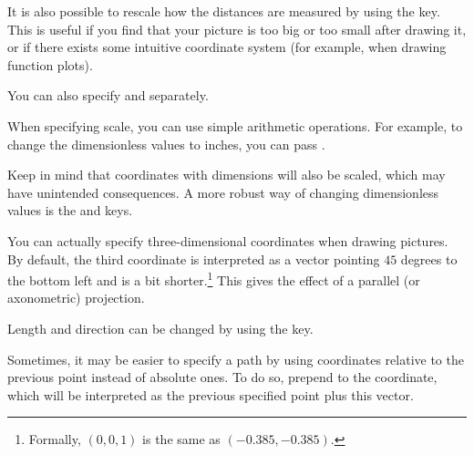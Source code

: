 It is also possible to rescale how the distances are measured by using the
 key. This is useful if you find that your picture is too big or
too small after drawing it, or if there exists some intuitive coordinate system
(for example, when drawing function plots).
\begin{example}
\end{example}
You can also specify  and  separately.

When specifying scale, you can use simple arithmetic operations. For example, to
change the dimensionless values to inches, you can pass .
\begin{example}
\end{example}
Keep in mind that coordinates with dimensions will also be scaled, which may
have unintended consequences. A more robust way of changing dimensionless
values is the  and  keys.
\begin{example}
\end{example}

You can actually specify three-dimensional coordinates when drawing pictures.
By default, the third coordinate is interpreted as a vector pointing \(45\)
degrees to the bottom left and is a bit shorter.\footnote{Formally,
\((0, 0, 1)\) is  the same as \((-0.385, -0.385)\).}
This gives the effect of a parallel (or axonometric) projection.
\begin{example}[vertical_mode, examplewidth=0.85\linewidth]
\end{example}
Length and direction can be changed by using the  key. %

Sometimes, it may be easier to specify a path by using coordinates relative to
the previous point instead of absolute ones. To do so, prepend \ltx{++} to the
coordinate, which will be interpreted as the previous specified point plus
this vector.
\begin{example}
\end{example}

